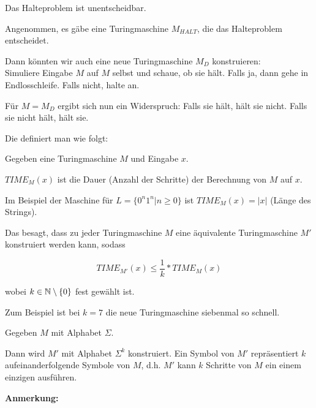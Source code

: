 \begin{satz}
    Das Halteproblem ist unentscheidbar.
\end{satz}

\begin{beweis}
    Angenommen, es gäbe eine Turingmaschine $M_{HALT}$, die das Halteproblem entscheidet.

    Dann könnten wir auch eine neue Turingmaschine $M_D$ konstruieren:\\
    Simuliere Eingabe $M$ auf $M$ selbst und schaue, ob sie hält. Falls ja, dann gehe in Endlosschleife. Falls nicht, halte an.

    Für $M = M_D$ ergibt sich nun ein Widerspruch: Falls sie hält, hält sie nicht. Falls sie nicht hält, hält sie.
\end{beweis}



\begin{definition}
    Die  definiert man wie folgt:

    Gegeben eine Turingmaschine $M$ und Eingabe $x$. 

    $TIME_M(x)$ ist die Dauer (Anzahl der Schritte) der Berechnung von $M$ auf $x$.
\end{definition}

Im Beispiel der Maschine für $L = \{ 0^n 1^n | n \geq 0 \}$ ist $TIME_M(x) = |x| $ (Länge des Strings).




\begin{satz}
    Das  besagt, dass zu jeder Turingmaschine $M$ eine äquivalente Turingmaschine $M'$ konstruiert werden kann, sodass

    $$ TIME_{M'}(x) \leq \frac{1}{k} * TIME_M(x) $$

    wobei $k \in \mathbb{N} \setminus \{0\}$ fest gewählt ist.
\end{satz}

Zum Beispiel ist bei $k = 7$ die neue Turingmaschine siebenmal so schnell.

\begin{beweis}
    Gegeben $M$ mit Alphabet $\Sigma$.

    Dann wird $M'$ mit Alphabet $\Sigma^k$ konstruiert. Ein Symbol von $M'$ repräsentiert $k$ aufeinanderfolgende Symbole von $M$, d.h. $M'$ kann $k$ Schritte von $M$ ein einem einzigen ausführen.
\end{beweis}

\textbf{Anmerkung:}

